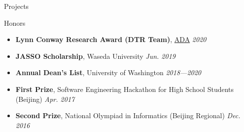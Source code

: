 \documentclass{resume}
\begin{document}
\begin{rSection}{Projects}




	\end{rSection}
	\vspace{-5pt}
	

	\begin{rSection}{Honors}
		\begin{itemize}
			\setlength{\itemsep}{1pt}
			\setlength{\parskip}{0pt}
			\setlength{\parsep}{0pt}
			\item \textbf{Lynn Conway Research Award (DTR Team)}, \href{https://adacenter.org}{ADA} \hfill {\em 2020}
			\item \textbf{JASSO Scholarship}, Waseda University \hfill {\em Jun. 2019}
			\item \textbf{Annual Dean's List}, University of Washington \hfill {\em 2018---2020}
			\item \textbf{First Prize}, Software Engineering Hackathon for High School Students (Beijing) \hfill {\em Apr. 2017}
			\item \textbf{Second Prize}, National Olympiad in Informatics (Beijing Regional) \hfill {\em Dec. 2016}
		\end{itemize}
	\end{rSection}
\end{document}
